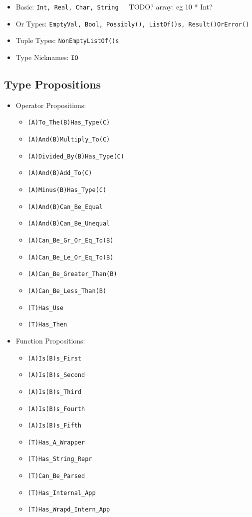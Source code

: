 \documentclass{article}
\begin{document}
\begin{itemize}
\item Basic: \texttt{Int, Real, Char, String}\ \ \ TODO? array: eg 10 * Int?
\item Or Types: \texttt{EmptyVal, Bool, Possibly(), ListOf()s, Result()OrError()}
\item Tuple Types: \texttt{NonEmptyListOf()s}
\item Type Nicknames: \texttt{IO}
\end{itemize}

\subsection{Type Propositions}

\begin{itemize}

\item Operator Propositions:

  \begin{itemize}
  \item \texttt{(A)To_The(B)Has_Type(C)}
  \item \texttt{(A)And(B)Multiply_To(C)}
  \item \texttt{(A)Divided_By(B)Has_Type(C)}
  \item \texttt{(A)And(B)Add_To(C)}
  \item \texttt{(A)Minus(B)Has_Type(C)}
  \item \texttt{(A)And(B)Can_Be_Equal}
  \item \texttt{(A)And(B)Can_Be_Unequal}
  \item \texttt{(A)Can_Be_Gr_Or_Eq_To(B)}
  \item \texttt{(A)Can_Be_Le_Or_Eq_To(B)}
  \item \texttt{(A)Can_Be_Greater_Than(B)}
  \item \texttt{(A)Can_Be_Less_Than(B)}
  \item \texttt{(T)Has_Use}
  \item \texttt{(T)Has_Then}
  \end{itemize}

\item Function Propositions:

  \begin{itemize}
  \item \texttt{(A)Is(B)s_First}
  \item \texttt{(A)Is(B)s_Second}
  \item \texttt{(A)Is(B)s_Third}
  \item \texttt{(A)Is(B)s_Fourth}
  \item \texttt{(A)Is(B)s_Fifth}
  \item \texttt{(T)Has_A_Wrapper}
  \item \texttt{(T)Has_String_Repr}
  \item \texttt{(T)Can_Be_Parsed}
  \item \texttt{(T)Has_Internal_App}
  \item \texttt{(T)Has_Wrapd_Intern_App}
  \end{itemize}


\end{itemize}
\end{document}
